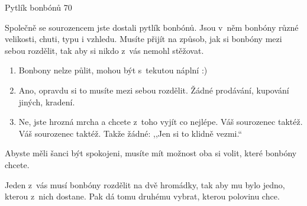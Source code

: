 Pytlík bonbónů
70 %

Společně se sourozencem jste dostali pytlík bonbónů. Jsou v~něm bonbóny
různé velikosti, chuti, typu i vzhledu. Musíte přijít na způsob, jak si
bonbóny mezi sebou rozdělit, tak aby si nikdo z~vás nemohl stěžovat.

\begin{enumerate}
\item Bonbony nelze půlit, mohou být s~tekutou náplní :)
\item Ano, opravdu si to musíte mezi sebou rozdělit. Žádné prodávání, kupování jiných, kradení.
\item Ne, jste hrozná mrcha a chcete z~toho vyjít co nejlépe. Váš sourozenec taktéž. Váš sourozenec taktéž. Takže žádné: ,,Jen si to klidně vezmi.``
\end{enumerate}

Abyste měli šanci být spokojeni, musíte mít možnost oba si volit, které bonbóny chcete.

Jeden z~vás musí bonbóny rozdělit na dvě hromádky, tak aby mu bylo jedno, kterou z~nich dostane. Pak dá tomu druhému vybrat, kterou polovinu chce.
